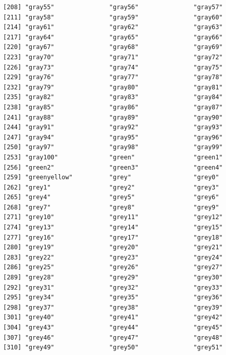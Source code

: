 \documentclass[a4paperpaper,]{article}
\theoremstyle{definition}
\theoremstyle{definition}
\theoremstyle{definition}
\theoremstyle{remark}
\begin{document}
\begin{verbatim}
[208] "gray55"               "gray56"               "gray57"              
[211] "gray58"               "gray59"               "gray60"              
[214] "gray61"               "gray62"               "gray63"              
[217] "gray64"               "gray65"               "gray66"              
[220] "gray67"               "gray68"               "gray69"              
[223] "gray70"               "gray71"               "gray72"              
[226] "gray73"               "gray74"               "gray75"              
[229] "gray76"               "gray77"               "gray78"              
[232] "gray79"               "gray80"               "gray81"              
[235] "gray82"               "gray83"               "gray84"              
[238] "gray85"               "gray86"               "gray87"              
[241] "gray88"               "gray89"               "gray90"              
[244] "gray91"               "gray92"               "gray93"              
[247] "gray94"               "gray95"               "gray96"              
[250] "gray97"               "gray98"               "gray99"              
[253] "gray100"              "green"                "green1"              
[256] "green2"               "green3"               "green4"              
[259] "greenyellow"          "grey"                 "grey0"               
[262] "grey1"                "grey2"                "grey3"               
[265] "grey4"                "grey5"                "grey6"               
[268] "grey7"                "grey8"                "grey9"               
[271] "grey10"               "grey11"               "grey12"              
[274] "grey13"               "grey14"               "grey15"              
[277] "grey16"               "grey17"               "grey18"              
[280] "grey19"               "grey20"               "grey21"              
[283] "grey22"               "grey23"               "grey24"              
[286] "grey25"               "grey26"               "grey27"              
[289] "grey28"               "grey29"               "grey30"              
[292] "grey31"               "grey32"               "grey33"              
[295] "grey34"               "grey35"               "grey36"              
[298] "grey37"               "grey38"               "grey39"              
[301] "grey40"               "grey41"               "grey42"              
[304] "grey43"               "grey44"               "grey45"              
[307] "grey46"               "grey47"               "grey48"              
[310] "grey49"               "grey50"               "grey51"              

\end{verbatim}
\end{document}

